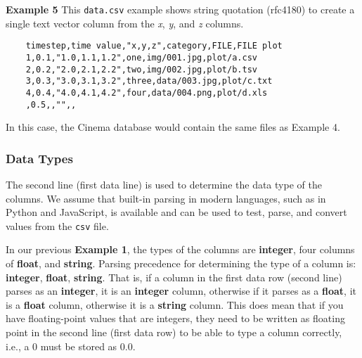 \noindent
\textbf{Example 5} This \texttt{\small data.csv} example shows string
quotation (rfc4180) to create a single text vector column from the
{\em x}, {\em y}, and {\em z} columns.

\begin{verbatim}
    timestep,time value,"x,y,z",category,FILE,FILE plot
    1,0.1,"1.0,1.1,1.2",one,img/001.jpg,plot/a.csv
    2,0.2,"2.0,2.1,2.2",two,img/002.jpg,plot/b.tsv
    3,0.3,"3.0,3.1,3.2",three,data/003.jpg,plot/c.txt
    4,0.4,"4.0,4.1,4.2",four,data/004.png,plot/d.xls
    ,0.5,,"",,
\end{verbatim}

\noindent
In this case, the Cinema database would contain the same files as Example 4.

\subsubsection{Data Types}

The second line (first data line) is used to determine the data type of the
columns.  We assume that built-in parsing in modern languages, such as in
Python and JavaScript, is available and can be used to test, parse, and convert 
values from the \texttt{\small csv} file.

In our previous {\bf Example 1}, the types of the columns are 
\textbf{integer}, four columns of \textbf{float}, and \textbf{string}. Parsing
precedence for determining the type of a column is: \textbf{integer},
\textbf{float}, \textbf{string}. That is, if a column in the first data row
(second line) parses as an \textbf{integer}, it is an \textbf{integer}
column, otherwise if it parses as a \textbf{float}, it is a \textbf{float}
column, otherwise it is a \textbf{string} column. This does mean that
if you have floating-point values that are integers, they need to be
written as floating point in the second line (first data row) to be able to 
type a column correctly, i.e., a 0 must be stored as 0.0.

